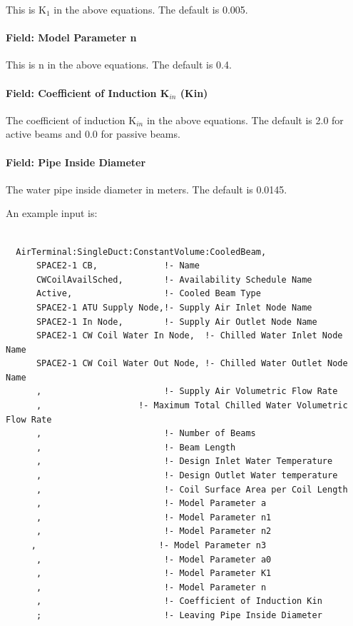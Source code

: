 This is K\(_{1}\) in the above equations. The default is 0.005.

\paragraph{Field: Model Parameter n}\label{field-model-parameter-n}

This is n in the above equations. The default is 0.4.

\paragraph{Field: Coefficient of Induction K\(_{in}\) (Kin)}\label{field-coefficient-of-induction-kux5fin-kin}

The coefficient of induction K\(_{in}\) in the above equations. The default is 2.0 for active beams and 0.0 for passive beams.

\paragraph{Field: Pipe Inside Diameter}\label{field-pipe-inside-diameter}

The water pipe inside diameter in meters. The default is 0.0145.

An example input is:

\begin{lstlisting}

  AirTerminal:SingleDuct:ConstantVolume:CooledBeam,
      SPACE2-1 CB,             !- Name
      CWCoilAvailSched,        !- Availability Schedule Name
      Active,                  !- Cooled Beam Type
      SPACE2-1 ATU Supply Node,!- Supply Air Inlet Node Name
      SPACE2-1 In Node,        !- Supply Air Outlet Node Name
      SPACE2-1 CW Coil Water In Node,  !- Chilled Water Inlet Node Name
      SPACE2-1 CW Coil Water Out Node, !- Chilled Water Outlet Node Name
      ,                        !- Supply Air Volumetric Flow Rate
      ,                   !- Maximum Total Chilled Water Volumetric Flow Rate
      ,                        !- Number of Beams
      ,                        !- Beam Length
      ,                        !- Design Inlet Water Temperature
      ,                        !- Design Outlet Water temperature
      ,                        !- Coil Surface Area per Coil Length
      ,                        !- Model Parameter a
      ,                        !- Model Parameter n1
      ,                        !- Model Parameter n2
     ,                        !- Model Parameter n3
      ,                        !- Model Parameter a0
      ,                        !- Model Parameter K1
      ,                        !- Model Parameter n
      ,                        !- Coefficient of Induction Kin
      ;                        !- Leaving Pipe Inside Diameter
\end{lstlisting}

